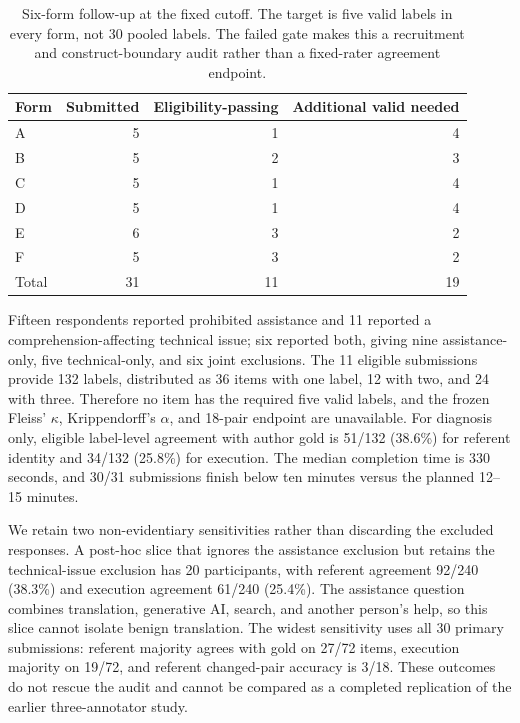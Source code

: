 \documentclass[10pt]{article}
\begin{document}
\begin{table}[H]
\centering
\small
\begin{tabular}{lrrr}
\toprule
Form & Submitted & Eligibility-passing & Additional valid needed \\
\midrule
A & 5 & 1 & 4 \\
B & 5 & 2 & 3 \\
C & 5 & 1 & 4 \\
D & 5 & 1 & 4 \\
E & 6 & 3 & 2 \\
F & 5 & 3 & 2 \\
\midrule
Total & 31 & 11 & 19 \\
\bottomrule
\end{tabular}
\caption{Six-form follow-up at the fixed cutoff. The target is five valid labels in every form,
not 30 pooled labels. The failed gate makes this a recruitment and construct-boundary audit rather
than a fixed-rater agreement endpoint.}
\label{tab:supp-wjx-incomplete}
\end{table}

Fifteen respondents reported prohibited assistance and 11 reported a comprehension-affecting
technical issue; six reported both, giving nine assistance-only, five technical-only, and six
joint exclusions. The 11 eligible submissions provide 132 labels, distributed as 36 items with
one label, 12 with two, and 24 with three. Therefore no item has the required five valid labels,
and the frozen Fleiss' $\kappa$, Krippendorff's $\alpha$, and 18-pair endpoint are unavailable.
For diagnosis only, eligible label-level agreement with author gold is 51/132 (38.6\%) for
referent identity and 34/132 (25.8\%) for execution. The median completion time is 330 seconds, and
30/31 submissions finish below ten minutes versus the planned 12--15 minutes.

We retain two non-evidentiary sensitivities rather than discarding the excluded responses. A
post-hoc slice that ignores the assistance exclusion but retains the technical-issue exclusion has
20 participants, with referent agreement 92/240 (38.3\%) and execution agreement 61/240 (25.4\%).
The assistance question combines translation, generative AI, search, and another person's help,
so this slice cannot isolate benign translation. The widest sensitivity uses all 30 primary
submissions: referent majority agrees with gold on 27/72 items, execution majority on 19/72, and
referent changed-pair accuracy is 3/18. These outcomes do not rescue the audit and cannot be
compared as a completed replication of the earlier three-annotator study.
\end{document}
